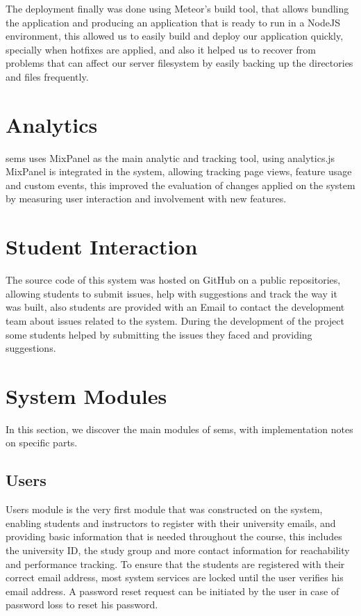 \newParagraph
The deployment finally was done using Meteor's build tool, that allows bundling the application and producing an application that is ready
to run in a NodeJS environment, this allowed us to easily build and deploy our application quickly, specially when hotfixes are applied,
and also it helped us to recover from problems that can affect our server filesystem by easily backing up the directories and files frequently.

\section{Analytics}
\label{sec:analytics}

\ac{sems} uses MixPanel\texttrademark{} as the main analytic and tracking tool, using analytics.js~\cite{analytics_js} MixPanel\texttrademark{} is
integrated in the system, allowing tracking page views, feature usage and custom events, this improved the evaluation of changes applied on the
system by measuring user interaction and involvement with new features.


\section{Student Interaction}
\label{sec:student-interaction}
The source code of this system was hosted on GitHub\texttrademark{} on a public repositories, allowing students to submit issues, help with
suggestions and track the way it was built, also students are provided with an Email to contact the development team about issues related
to the system. During the development of the project some students helped by submitting the issues they faced and providing suggestions.

\section{System Modules}
\label{sec:modules}

In this section, we discover the main modules of \ac{sems}, with implementation notes on specific parts.

\subsection{Users}
\label{sub:users}
Users module is the very first module that was constructed on the system, enabling students and instructors to register with their
university emails, and providing basic information that is needed throughout the course, this includes the university ID, the study group
and more contact information for reachability and performance tracking. To ensure that the students are registered with their correct email
address, most system services are locked until the user verifies his email address. A password reset request can be initiated by the user
in case of password loss to reset his password.


